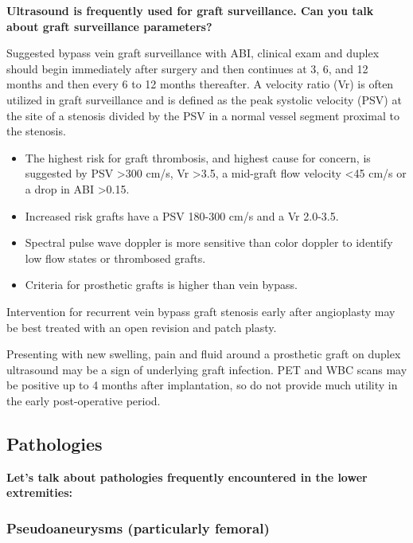 \documentclass[
]{book}
\begin{document}
\textbf{Ultrasound is frequently used for graft surveillance. Can you talk
about graft surveillance parameters?}

Suggested bypass vein graft surveillance with ABI, clinical exam and
duplex should begin immediately after surgery and then continues at 3,
6, and 12 months and then every 6 to 12 months thereafter.\citep{conte2006, zierler2018} A velocity ratio (Vr) is often utilized in graft
surveillance and is defined as the peak systolic velocity (PSV) at the
site of a stenosis divided by the PSV in a normal vessel segment
proximal to the stenosis.

\begin{itemize}
\item
  The highest risk for graft thrombosis, and highest cause for
  concern, is suggested by PSV \textgreater300 cm/s, Vr \textgreater3.5, a mid-graft flow
  velocity \textless45 cm/s or a drop in ABI \textgreater0.15.
  \citep{bandykHemodynamicsVeinGraft1988, zierler2018}
\item
  Increased risk grafts have a PSV 180-300 cm/s and a Vr 2.0-3.5.
\item
  Spectral pulse wave doppler is more sensitive than color doppler to
  identify low flow states or thrombosed grafts.\citep{hedrick2005}
\item
  Criteria for prosthetic grafts is higher than vein bypass.
  \citep{zierler2018}
\end{itemize}

Intervention for recurrent vein bypass graft stenosis early after
angioplasty may be best treated with an open revision and patch
plasty.\citep{jongsma2016}

Presenting with new swelling, pain and fluid around a prosthetic graft
on duplex ultrasound may be a sign of underlying graft infection. PET
and WBC scans may be positive up to 4 months after implantation, so do
not provide much utility in the early post-operative period.\citep{puges2019}

\hypertarget{pathologies}{%
\subsection{Pathologies}\label{pathologies}}

\textbf{Let's talk about pathologies frequently encountered in the lower
extremities:}

\hypertarget{psa}{%
\subsubsection{Pseudoaneurysms (particularly femoral)}\label{psa}}
\end{document}
